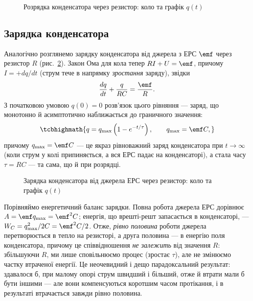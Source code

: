 \begin{figure}[h!]\centering
	\caption{Розрядка конденсатора через резистор: коло та графік $q(t)$\label{pic:RCDischarge}}
\end{figure}

\subsection*{Зарядка конденсатора}

Аналогічно розглянемо зарядку конденсатора від джерела з ЕРС $\emf$ через резистор $R$ (рис.~\ref{pic:RCCharge}). Закон Ома для кола тепер
$RI + U = \emf$, причому $I = +dq/dt$ (струм тече в напрямку \emph{зростання} заряду), звідки
\begin{equation}\label{eq:RCCharge}
	\frac{dq}{dt} + \frac{q}{RC} = \frac{\emf}{R}.
\end{equation}
З початковою умовою $q(0) = 0$ розв'язок цього рівняння --- заряд, що монотонно й асимптотично наближається до граничного значення:
\begin{equation}\label{eq:RCChargeSolution}
	\tcbhighmath{
		q = q_{\max}\left(1 - e^{-t/\tau}\right), \qquad q_{\max} = \emf C,
	}
\end{equation}
причому $q_{\max} = \emf C$ --- це якраз рівноважний заряд конденсатора при $t\to\infty$ (коли струм у колі припиняється, а вся ЕРС падає на
конденсаторі), а стала часу $\tau = RC$ --- та сама, що й при розрядці.

\begin{figure}[h!]\centering
	\caption{Зарядка конденсатора від джерела ЕРС через резистор: коло та графік $q(t)$\label{pic:RCCharge}}
\end{figure}


Порівняймо енергетичний баланс зарядки. Повна робота джерела ЕРС дорівнює $A = \emf q_{\max} = \emf^2 C$; енергія, що врешті-решт запасається в конденсаторі, --- $W_C = q_{\max}^2/2C = \emf^2 C/2$. Отже, \emph{рівно половина} роботи джерела перетворюється в тепло на резисторі, а друга половина --- в енергію поля конденсатора, причому це співвідношення \emph{не залежить} від значення $R$: збільшуючи $R$, ми лише сповільнюємо процес (зростає $\tau$), але не змінюємо частку втраченої енергії. Це неочевидний і дещо парадоксальний результат: здавалося б, при малому опорі струм швидший і більший, отже й втрати мали б бути іншими --- але вони компенсуються коротшим часом протікання, і в результаті втрачається завжди рівно половина.


